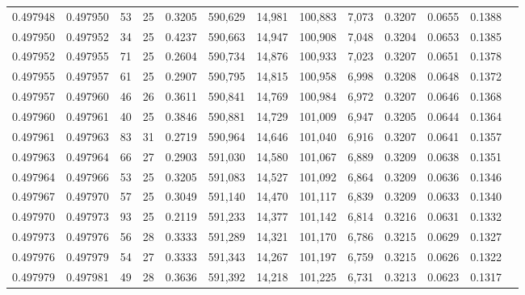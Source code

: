 \begin{tabular}{rrrrrrrrrrrrr}
0.497948 & 0.497950 &  53 &  25 &                                     0.3205 & 590,629 &  14,981 & 100,883 &   7,073 & 0.3207 & 0.0655 & 0.1388 \\
0.497950 & 0.497952 &  34 &  25 &                                     0.4237 & 590,663 &  14,947 & 100,908 &   7,048 & 0.3204 & 0.0653 & 0.1385 \\
0.497952 & 0.497955 &  71 &  25 &                                     0.2604 & 590,734 &  14,876 & 100,933 &   7,023 & 0.3207 & 0.0651 & 0.1378 \\
0.497955 & 0.497957 &  61 &  25 &                                     0.2907 & 590,795 &  14,815 & 100,958 &   6,998 & 0.3208 & 0.0648 & 0.1372 \\
0.497957 & 0.497960 &  46 &  26 &                                     0.3611 & 590,841 &  14,769 & 100,984 &   6,972 & 0.3207 & 0.0646 & 0.1368 \\
0.497960 & 0.497961 &  40 &  25 &                                     0.3846 & 590,881 &  14,729 & 101,009 &   6,947 & 0.3205 & 0.0644 & 0.1364 \\
0.497961 & 0.497963 &  83 &  31 &                                     0.2719 & 590,964 &  14,646 & 101,040 &   6,916 & 0.3207 & 0.0641 & 0.1357 \\
0.497963 & 0.497964 &  66 &  27 &                                     0.2903 & 591,030 &  14,580 & 101,067 &   6,889 & 0.3209 & 0.0638 & 0.1351 \\
0.497964 & 0.497966 &  53 &  25 &                                     0.3205 & 591,083 &  14,527 & 101,092 &   6,864 & 0.3209 & 0.0636 & 0.1346 \\
0.497967 & 0.497970 &  57 &  25 &                                     0.3049 & 591,140 &  14,470 & 101,117 &   6,839 & 0.3209 & 0.0633 & 0.1340 \\
0.497970 & 0.497973 &  93 &  25 &                                     0.2119 & 591,233 &  14,377 & 101,142 &   6,814 & 0.3216 & 0.0631 & 0.1332 \\
0.497973 & 0.497976 &  56 &  28 &                                     0.3333 & 591,289 &  14,321 & 101,170 &   6,786 & 0.3215 & 0.0629 & 0.1327 \\
0.497976 & 0.497979 &  54 &  27 &                                     0.3333 & 591,343 &  14,267 & 101,197 &   6,759 & 0.3215 & 0.0626 & 0.1322 \\
0.497979 & 0.497981 &  49 &  28 &                                     0.3636 & 591,392 &  14,218 & 101,225 &   6,731 & 0.3213 & 0.0623 & 0.1317 \\

\end{tabular}

